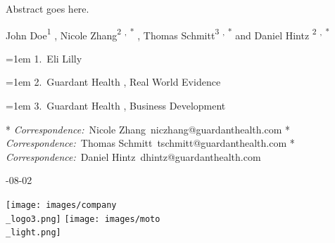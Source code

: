 \documentclass[
  onepage,
  openany]{scrbook}
\begin{document}
\begin{frontmatter}
\begin{titlepage}
\begin{minipage}[b][\textheight][s]{0.85\textwidth}
%
\begin{flushright}%
{{Abstract goes here.}}\\[4\baselineskip]%
\end{flushright}%


 {\large{John Doe}}{\textsuperscript{1}}%
%
, 
 {\large{Nicole Zhang}}{\textsuperscript{2}}%
%
\textsuperscript{,}%
{\textsuperscript{*}}%
%
, 
 {\large{Thomas Schmitt}}{\textsuperscript{3}}%
%
\textsuperscript{,}%
{\textsuperscript{*}}%
%
%
{ and \large{Daniel Hintz}}%
{\textsuperscript{2}}%
%
\textsuperscript{,}%
{\textsuperscript{*}}%
%




\vspace{2\baselineskip} 

\hangindent=1em
%
{1}.~{Eli Lilly}%
%
%
\par\hangindent=1em%
%
{2}.~{Guardant Health}%
%
, %
{Real World Evidence}%
%
%
\par\hangindent=1em%
%
{3}.~{Guardant Health}%
%
, %
{Business Development}%
%
%


\vspace{1\baselineskip} 

* \textit{Correspondence:}~Nicole Zhang~niczhang@guardanthealth.com
* \textit{Correspondence:}~Thomas Schmitt~tschmitt@guardanthealth.com
* \textit{Correspondence:}~Daniel Hintz~dhintz@guardanthealth.com


\vfill

{-08-02}\\[\baselineskip]

\vspace{0.1\textheight} 

\texttt{[image: images/company\\\_logo3.png]}
\hspace{0.1\textheight} 
\texttt{[image: images/moto\\\_light.png]}

\end{minipage}  
\end{titlepage}
\setcounter{page}{1}
\end{frontmatter}
\end{document}
